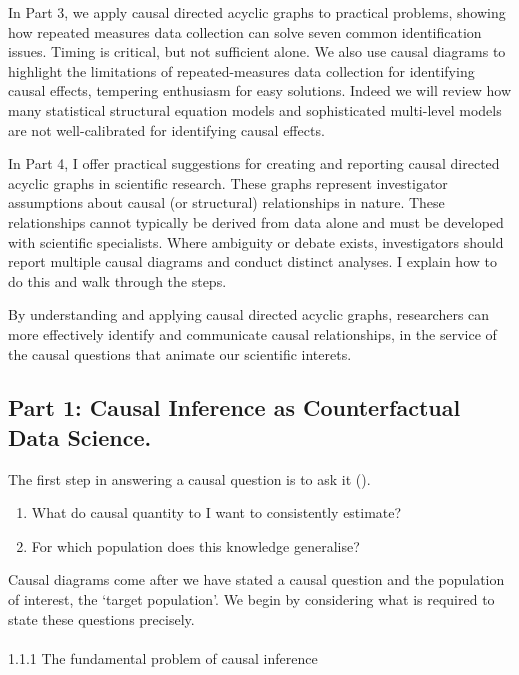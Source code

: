 \documentclass[
  single column]{article}
\makeatletter
\let\oldparagraph\paragraph
\renewcommand{\paragraph}{
    \@ifstar
      \xxxParagraphStar
      \xxxParagraphNoStar
  }
\newcommand{\xxxParagraphStar}[1]{\oldparagraph*{#1}\mbox{}}
\newcommand{\xxxParagraphNoStar}[1]{\oldparagraph{#1}\mbox{}}
\providecommand{\tightlist}{%
  \setlength{\itemsep}{0pt}\setlength{\parskip}{0pt}}\usepackage{longtable,booktabs,array}
\makeatother
\begin{document}
In Part 3, we apply causal directed acyclic graphs to practical
problems, showing how repeated measures data collection can solve seven
common identification issues. Timing is critical, but not sufficient
alone. We also use causal diagrams to highlight the limitations of
repeated-measures data collection for identifying causal effects,
tempering enthusiasm for easy solutions. Indeed we will review how many
statistical structural equation models and sophisticated multi-level
models are not well-calibrated for identifying causal effects.

In Part 4, I offer practical suggestions for creating and reporting
causal directed acyclic graphs in scientific research. These graphs
represent investigator assumptions about causal (or structural)
relationships in nature. These relationships cannot typically be derived
from data alone and must be developed with scientific specialists. Where
ambiguity or debate exists, investigators should report multiple causal
diagrams and conduct distinct analyses. I explain how to do this and
walk through the steps.

By understanding and applying causal directed acyclic graphs,
researchers can more effectively identify and communicate causal
relationships, in the service of the causal questions that animate our
scientific interets.

\subsection{Part 1: Causal Inference as Counterfactual Data
Science.}\label{part-1-causal-inference-as-counterfactual-data-science.}

The first step in answering a causal question is to ask it
().

\begin{enumerate}
\def\labelenumi{\arabic{enumi}.}
\tightlist
\item
  What do causal quantity to I want to consistently estimate?
\item
  For which population does this knowledge generalise?
\end{enumerate}

Causal diagrams come after we have stated a causal question and the
population of interest, the `target population'. We begin by considering
what is required to state these questions precisely.

\paragraph{1.1.1 The fundamental problem of causal
inference}\label{the-fundamental-problem-of-causal-inference}
\end{document}
